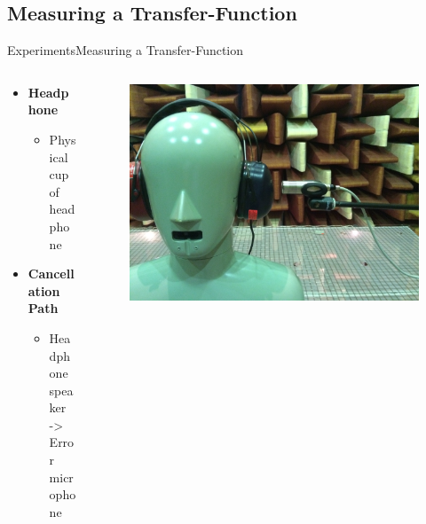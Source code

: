 \subsection{Measuring a Transfer-Function}

\begin{frame}{Experiments}{Measuring a Transfer-Function}		
	\begin{columns}
		\begin{column}{0.5\textwidth}
			\begin{itemize}
				\item[] \textbf{Headphone}
					\begin{itemize}
						\item Physical cup of headphone
					\end{itemize}
				\item[] \textbf{Cancellation Path}
					\begin{itemize}
						\item Headphone speaker \\-> Error microphone
					\end{itemize}
			\end{itemize}
		\end{column}
		\begin{column}{0.5\textwidth} 
			\begin{figure}[h]
				\includegraphics[width=1\textwidth]{figures/CloseUpHPCP}
			\end{figure}
		\end{column}
	\end{columns}
\end{frame}




